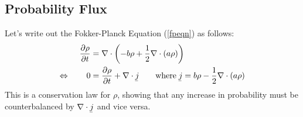 \documentclass[12pt]{article}
\theoremstyle{plain}
\theoremstyle{definition}
\theoremstyle{remark}
\begin{document}
\subsection{Probability Flux}

Let's write out the Fokker-Planck Equation (\ref{fpeqn}) as follows:
\begin{align*}
  \frac{\partial\rho}{\partial t}
  &= \nabla \cdot \left( -b\rho + \frac{1}{2}\nabla \cdot (a\rho)\right)\\
  \Leftrightarrow\qquad
  0&=
  \frac{\partial\rho}{\partial t}
  + \nabla \cdot \underaccent{\bar}{j}
  \qquad
  \text{where}\;
  \underaccent{\bar}{j} = b\rho - \frac{1}{2}\nabla\cdot(a\rho)
\end{align*}
This is a conservation law for $\rho$, showing that any increase in
probability must be counterbalanced by $\nabla \cdot
\underaccent{\bar}{j}$ and vice versa.











\end{document}
